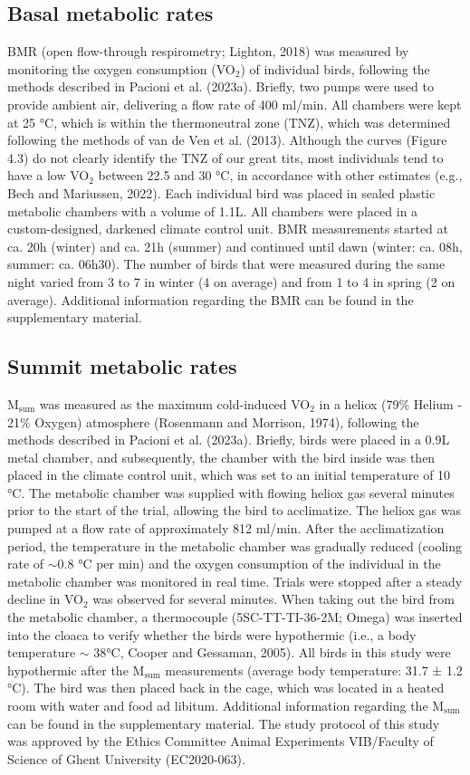 \documentclass[10pt, twoside]{book} %
\begin{document}
\subsection{Basal metabolic rates}
BMR (open flow-through respirometry; Lighton, 2018) was measured by monitoring the oxygen consumption (VO$_{\text{2}}$) of individual birds, following the methods described in Pacioni et al. (2023a). Briefly, two pumps were used to provide ambient air, delivering a flow rate of 400 ml/min. All chambers were kept at 25 °C, which is within the thermoneutral zone (TNZ), which was determined following the methods of van de Ven et al. (2013). Although the curves (Figure 4.3) do not clearly identify the TNZ of our great tits, most individuals tend to have a low VO$_{\text{2}}$ between 22.5 and 30 °C, in accordance with other estimates (e.g., Bech and Mariussen, 2022). Each individual bird was placed in sealed plastic metabolic chambers with a volume of 1.1L. All chambers were placed in a custom-designed, darkened climate control unit. BMR measurements started at ca. 20h (winter) and ca. 21h (summer) and continued until dawn (winter: ca. 08h, summer: ca. 06h30). The number of birds that were measured during the same night varied from 3 to 7 in winter (4 on average) and from 1 to 4 in spring (2 on average). Additional information regarding the BMR can be found in the supplementary material.

\subsection{Summit metabolic rates}
M$_{\text{sum}}$ was measured as the maximum cold-induced VO$_{\text{2}}$ in a heliox (79\% Helium - 21\% Oxygen) atmosphere (Rosenmann and Morrison, 1974), following the methods described in Pacioni et al. (2023a). Briefly, birds were placed in a 0.9L metal chamber, and subsequently, the chamber with the bird inside was then placed in the climate control unit, which was set to an initial temperature of 10 °C. The metabolic chamber was supplied with flowing heliox gas several minutes prior to the start of the trial, allowing the bird to acclimatize. The heliox gas was pumped at a flow rate of approximately 812 ml/min. After the acclimatization period, the temperature in the metabolic chamber was gradually reduced (cooling rate of $\sim$0.8 °C per min) and the oxygen consumption of the individual in the metabolic chamber was monitored in real time. Trials were stopped after a steady decline in VO$_{\text{2}}$ was observed for several minutes. When taking out the bird from the metabolic chamber, a thermocouple (5SC-TT-TI-36-2M; Omega) was inserted into the cloaca to verify whether the birds were hypothermic (i.e., a body temperature $\sim$ 38°C, Cooper and Gessaman, 2005). All birds in this study were hypothermic after the M$_{\text{sum}}$ measurements (average body temperature: 31.7 ± 1.2 °C). The bird was then placed back in the cage, which was located in a heated room with water and food ad libitum. Additional information regarding the M$_{\text{sum}}$ can be found in the supplementary material.\newline
The study protocol of this study was approved by the Ethics Committee Animal Experiments VIB/Faculty of Science of Ghent University (EC2020-063).
\end{document}
